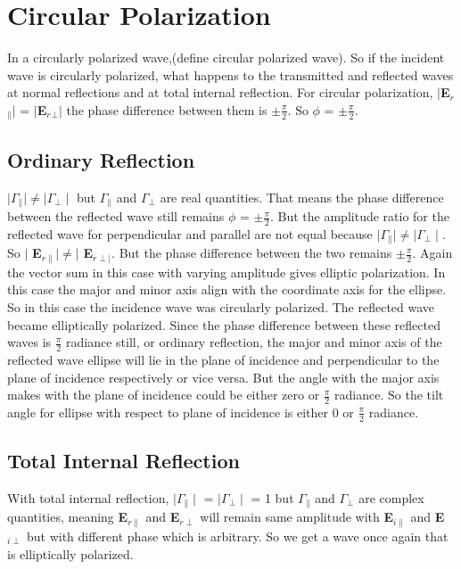 \section{Circular Polarization}
In a circularly polarized wave,(define circular polarized wave). So if the incident wave is circularly polarized, what happens to the transmitted and reflected waves at normal reflections and at total internal reflection. For circular polarization, $\mid$\textbf{E$_r$$_\parallel$}$\mid$ = $\mid$\textbf{E$_r$$_\perp$}$\mid$ the phase difference between them is $\pm\frac{\pi}{2}$. So $\phi$ = $\pm\frac{\pi}{2}$.
\subsection{Ordinary Reflection}
$\mid\Gamma_\parallel\mid \neq \mid\Gamma_\perp\mid$ but $\Gamma_\parallel$ and $\Gamma_\perp$ are real quantities. That means the phase difference between the reflected wave still remains $\phi$ = $\pm\frac{\pi}{2}$. But the amplitude ratio for the reflected wave for perpendicular and parallel are not equal because $\mid\Gamma_\parallel\mid \neq \mid \Gamma_\perp \mid$. So $\mid$ \textbf{E}$_{r\parallel} \mid \neq \mid$ \textbf{E}$_{r\perp\mid}$. But the phase difference between the two remains $\pm\frac{\pi}{2}$. Again the vector sum in this case with varying amplitude gives elliptic polarization. In this case the major and minor axis align with the coordinate axis for the ellipse. So in this case the incidence wave was circularly polarized. The reflected wave became elliptically polarized. Since the phase difference between these reflected waves is $\frac{\pi}{2}$ radiance still, or ordinary reflection, the major and minor axis of the reflected wave ellipse will lie in the plane of incidence and perpendicular to the plane of incidence respectively or vice versa. But the angle with the major axis makes with the plane of incidence could be either zero or $\frac{\pi}{2}$ radiance. So the tilt angle for ellipse with respect to plane of incidence is either 0 or $\frac{\pi}{2}$ radiance.
\subsection{Total Internal Reflection}
With total internal reflection, $\mid\Gamma_\parallel\mid$ = $\mid\Gamma_\perp\mid$ = 1 but $\Gamma_\parallel$ and $\Gamma_\perp$ are complex quantities, meaning
\textbf{E}$_{r\parallel}$ and \textbf{E}$_{r\perp}$ will remain same amplitude with \textbf{E}$_{i\parallel}$ and \textbf{E}$_{i\perp}$ but with different phase which is arbitrary. So we get a wave once again that is elliptically polarized.

